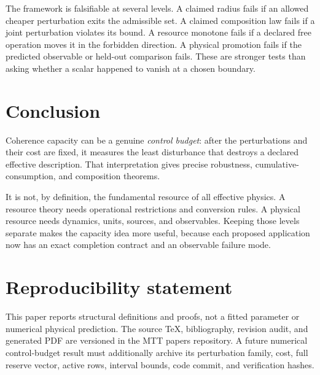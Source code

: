 \documentclass[11pt]{article}
\theoremstyle{definition}
\theoremstyle{remark}
\begin{document}
The framework is falsifiable at several levels.  A claimed radius fails if
an allowed cheaper perturbation exits the admissible set.  A claimed
composition law fails if a joint perturbation violates its bound.  A
resource monotone fails if a declared free operation moves it in the
forbidden direction.  A physical promotion fails if the predicted
observable or held-out comparison fails.  These are stronger tests than
asking whether a scalar happened to vanish at a chosen boundary.

\section{Conclusion}
\label{sec:conclusion}

Coherence capacity can be a genuine \emph{control budget}: after the
perturbations and their cost are fixed, it measures the least disturbance
that destroys a declared effective description.  That interpretation gives
precise robustness, cumulative-consumption, and composition theorems.

It is not, by definition, the fundamental resource of all effective
physics.  A resource theory needs operational restrictions and conversion
rules.  A physical resource needs dynamics, units, sources, and observables.
Keeping those levels separate makes the capacity idea more useful, because
each proposed application now has an exact completion contract and an
observable failure mode.

\section*{Reproducibility statement}

This paper reports structural definitions and proofs, not a fitted
parameter or numerical physical prediction.  The source TeX, bibliography,
revision audit, and generated PDF are versioned in the MTT papers
repository.  A future numerical control-budget result must additionally
archive its perturbation family, cost, full reserve vector, active rows,
interval bounds, code commit, and verification hashes.



\end{document}
